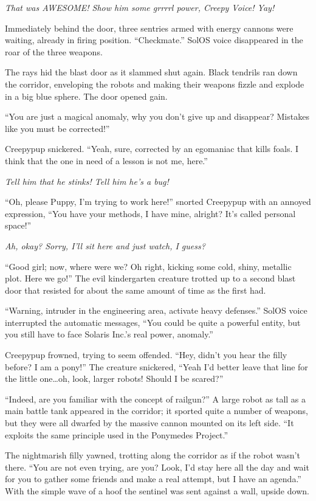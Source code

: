 \emph{That was AWESOME! Show him some grrrrl power, Creepy Voice! Yay!}

Immediately behind the door, three sentries armed with energy cannons were waiting, already in firing position. ``Checkmate.'' SolOS voice disappeared in the roar of the three weapons.

The rays hid the blast door as it slammed shut again. Black tendrils ran down the corridor, enveloping the robots and making their weapons fizzle and explode in a big blue sphere. The door opened gain.

``You are just a magical anomaly, why you don't give up and disappear? Mistakes like you must be corrected!''

Creepypup snickered. ``Yeah, sure, corrected by an egomaniac that kills foals. I think that the one in need of a lesson is not me, here.''

\emph{Tell him that he stinks! Tell him he's a bug!}

``Oh, please Puppy, I'm trying to work here!'' snorted Creepypup with an annoyed expression, ``You have your methods, I have mine, alright? It's called personal space!''

\emph{Ah, okay? Sorry, I'll sit here and just watch, I guess?}

``Good girl; now, where were we? Oh right, kicking some cold, shiny, metallic plot. Here we go!'' The evil kindergarten creature trotted up to a second blast door that resisted for about the same amount of time as the first had.

``{\mt Warning, intruder in the engineering area, activate heavy defenses.}'' SolOS voice interrupted the automatic messages, ``{\mt You could be quite a powerful entity, but you still have to face Solaris Inc.'s real power, anomaly.}''

Creepypup frowned, trying to seem offended. ``Hey, didn't you hear the filly before? I am a pony!'' The creature snickered, ``Yeah I'd better leave that line for the little one\dots oh, look, larger robots! Should I be scared?''

``Indeed, are you familiar with the concept of railgun?'' A large robot as tall as a main battle tank appeared in the corridor; it sported quite a number of weapons, but they were all dwarfed by the massive cannon mounted on its left side. ``It exploits the same principle used in the Ponymedes Project.''

The nightmarish filly yawned, trotting along the corridor as if the robot wasn't there. ``You are not even trying, are you? Look, I'd stay here all the day and wait for you to gather some friends and make a real attempt, but I have an agenda.'' With the simple wave of a hoof the sentinel was sent against a wall, upside down.

